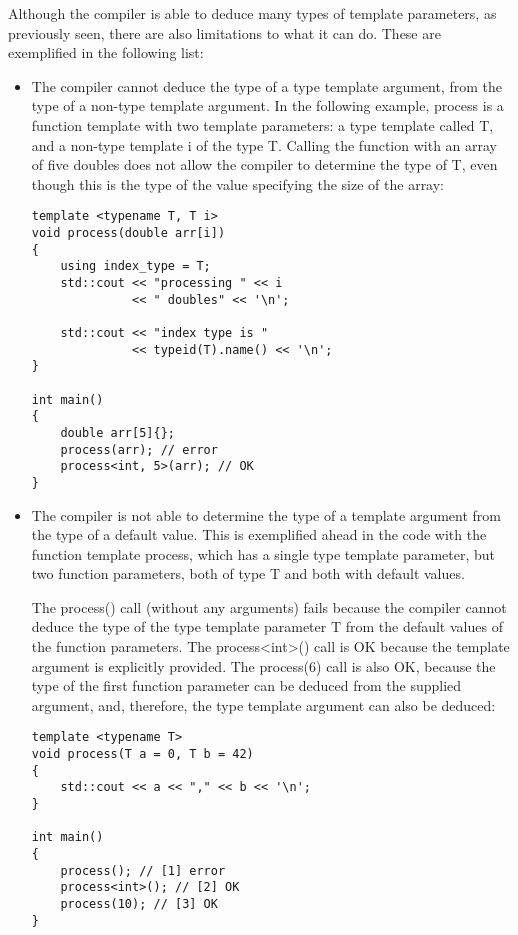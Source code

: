 Although the compiler is able to deduce many types of template parameters, as previously seen, there are also limitations to what it can do. These are exemplified in the following list:

\begin{itemize}
\item
The compiler cannot deduce the type of a type template argument, from the type of a non-type template argument. In the following example, process is a function template with two template parameters: a type template called T, and a non-type template i of the type T. Calling the function with an array of five doubles does not allow the compiler to determine the type of T, even though this is the type of the value specifying the size of the array:

\begin{lstlisting}[style=styleCXX]
template <typename T, T i>
void process(double arr[i])
{
	using index_type = T;
	std::cout << "processing " << i
	          << " doubles" << '\n';
	          
	std::cout << "index type is "
              << typeid(T).name() << '\n';
}

int main()
{
	double arr[5]{};
	process(arr); // error
	process<int, 5>(arr); // OK
}
\end{lstlisting}

\item
The compiler is not able to determine the type of a template argument from the type of a default value. This is exemplified ahead in the code with the function template process, which has a single type template parameter, but two function parameters, both of type T and both with default values.

The process() call (without any arguments) fails because the compiler cannot deduce the type of the type template parameter T from the default values of the function parameters. The process<int>() call is OK because the template argument is explicitly provided. The process(6) call is also OK, because the type of the first function parameter can be deduced from the supplied argument, and, therefore, the type template argument can also be deduced:

\begin{lstlisting}[style=styleCXX]
template <typename T>
void process(T a = 0, T b = 42)
{
	std::cout << a << "," << b << '\n';
}

int main()
{
	process(); // [1] error
	process<int>(); // [2] OK
	process(10); // [3] OK
}
\end{lstlisting}


\end{itemize}
